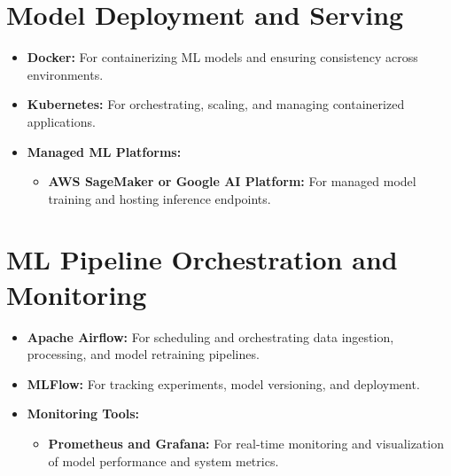 \documentclass[11pt]{article}
\begin{document}
\section{Model Deployment and Serving}
\begin{itemize}[noitemsep]
    \item \textbf{Docker:} For containerizing ML models and ensuring consistency across environments.
    \item \textbf{Kubernetes:} For orchestrating, scaling, and managing containerized applications.
    \item \textbf{Managed ML Platforms:} 
    \begin{itemize}[noitemsep]
        \item \textbf{AWS SageMaker or Google AI Platform:} For managed model training and hosting inference endpoints.
    \end{itemize}
\end{itemize}

\section{ML Pipeline Orchestration and Monitoring}
\begin{itemize}[noitemsep]
    \item \textbf{Apache Airflow:} For scheduling and orchestrating data ingestion, processing, and model retraining pipelines.
    \item \textbf{MLFlow:} For tracking experiments, model versioning, and deployment.
    \item \textbf{Monitoring Tools:} 
    \begin{itemize}[noitemsep]
        \item \textbf{Prometheus and Grafana:} For real-time monitoring and visualization of model performance and system metrics.
    \end{itemize}
\end{itemize}
\end{document}
